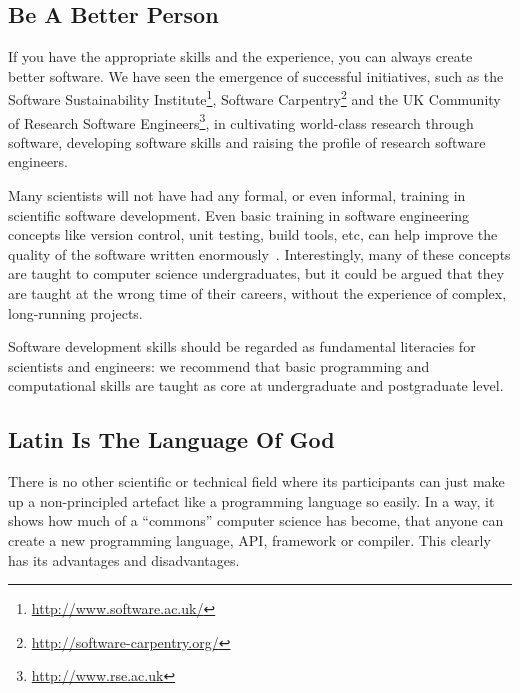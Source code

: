 \documentclass[10pt,conference,final]{IEEEtran}
\begin{document}
\subsection{Be A Better Person}

If you have the appropriate skills and the experience, you can always
create better software. We have seen the emergence of successful
initiatives, such as the Software Sustainability
Institute\footnote{\url{http://www.software.ac.uk/}}, Software
Carpentry\footnote{\url{http://software-carpentry.org/}} and the UK
Community of Research Software
Engineers\footnote{\url{http://www.rse.ac.uk}}, in cultivating
world-class research through software, developing software skills and
raising the profile of research software engineers.

Many scientists will not have had any formal, or even informal,
training in scientific software development. Even basic training in software engineering
concepts like version control, unit testing, build tools, etc, can help improve the
quality of the software written enormously~\cite{wilson2006}.
Interestingly, many of these concepts are taught to computer science
undergraduates, but it could be argued that they are taught at the
wrong time of their careers, without the experience of complex,
long-running projects.

 Software
development skills should be regarded as fundamental literacies for
scientists and engineers: we recommend that basic programming and
computational skills are taught as core at undergraduate and
postgraduate level.

\subsection{Latin Is The Language Of God} 

There is no other scientific or technical field where its participants
can just make up a non-principled artefact like a programming language
so easily. In a way, it shows how much of a ``commons'' computer
science has become, that anyone can create a new programming language,
API, framework or compiler. This clearly has its advantages and
disadvantages.
\end{document}
